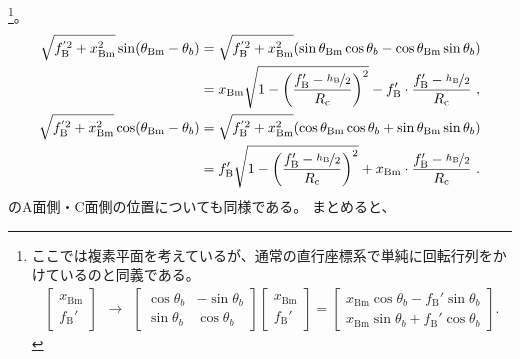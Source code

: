 \footnote{ここでは複素平面を考えているが、通常の直行座標系で単純に回転行列をかけているのと同義である。
\begin{align*}
  \left[
    \begin{array}{c}
      x_\mathrm{Bm}\\
      f_\mathrm B'
    \end{array}
  \right]
  ~~\longrightarrow~~
  \left[
    \begin{array}{cc}
      \cos\theta_b & -\sin\theta_b\\
      \sin\theta_b & \cos\theta_b
    \end{array}
  \right]\!\!
  \left[
    \begin{array}{c}
      x_\mathrm{Bm}\\
      f_\mathrm B'
    \end{array}
  \right]
  = \left[
    \begin{array}{c}
      x_\mathrm{Bm}\cos\theta_b-f_\mathrm B'\sin\theta_b\\
      x_\mathrm{Bm}\sin\theta_b+f_\mathrm B'\cos\theta_b
    \end{array}
  \right].
\end{align*}%
}。
\begin{align*}
  \sqrt{f_\mathrm B^{'2}+x_\mathrm{Bm}^2}\sin(\theta_\mathrm{Bm}-\theta_b)
  &= \sqrt{f_\mathrm B^{'2}+x_\mathrm{Bm}^2}(\sin\theta_\mathrm{Bm}\cos\theta_b-\cos\theta_\mathrm{Bm}\sin\theta_b)\\
  &= x_\mathrm{Bm}\sqrt{1-\left(\frac{f_\mathrm B'-\nicefrac{h_\mathrm B}2}{R_\mathrm c}\right)^2}
     -f_\mathrm B'\cdot\frac{f_\mathrm B'-\nicefrac{h_\mathrm B}2}{R_\mathrm c}~,\\
  \sqrt{f_\mathrm B^{'2}+x_\mathrm{Bm}^2}\cos(\theta_\mathrm{Bm}-\theta_b)
  &= \sqrt{f_\mathrm B^{'2}+x_\mathrm{Bm}^2}(\cos\theta_\mathrm{Bm}\cos\theta_b+\sin\theta_\mathrm{Bm}\sin\theta_b)\\
  &= f_\mathrm B'\sqrt{1-\left(\frac{f_\mathrm B'-\nicefrac{h_\mathrm B}2}{R_\mathrm c}\right)^2}
     +x_\mathrm{Bm}\cdot\frac{f_\mathrm B'-\nicefrac{h_\mathrm B}2}{R_\mathrm c}~.
\end{align*}
\EndFace のA面側・C面側の位置についても同様である。
まとめると、
